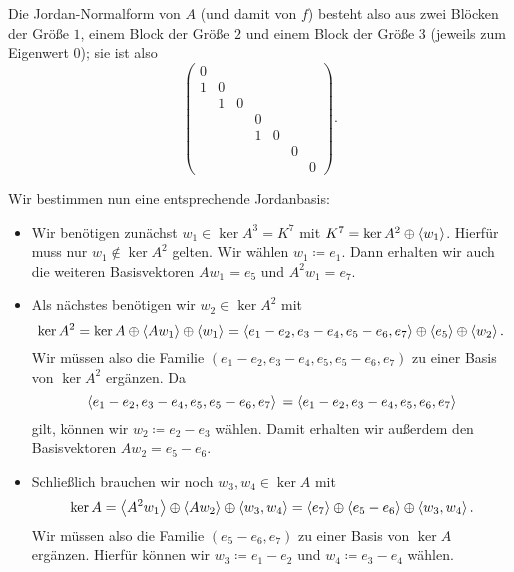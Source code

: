 \begin{example}
  Die Jordan-Normalform von $A$ (und damit von $f$) besteht also aus zwei Blöcken der Größe $1$, einem Block der Größe $2$ und einem Block der Größe $3$ (jeweils zum Eigenwert $0$);
  sie ist also
  \[
    \begin{pmatrix}
      0 &   &   &   &   &   &   \\
      1 & 0 &   &   &   &   &   \\
        & 1 & 0 &   &   &   &   \\
        &   &   & 0 &   &   &   \\
        &   &   & 1 & 0 &   &   \\
        &   &   &   &   & 0 &   \\
        &   &   &   &   &   & 0
    \end{pmatrix}.
  \]

  Wir bestimmen nun eine entsprechende Jordanbasis:
  \begin{itemize}
    \item
      Wir benötigen zunächst $w_1 \in \ker A^3 = K^7$ mit $K^7 = \ker A^2 \oplus \left\langle w_1 \right\rangle$.
      Hierfür muss nur $w_1 \notin \ker A^2$ gelten.
      Wir wählen $w_1 \coloneqq e_1$.
      Dann erhalten wir auch die weiteren Basisvektoren $A w_1 = e_5$ und $A^2 w_1 = e_7$.
    \item
      Als nächstes benötigen wir $w_2 \in \ker A^2$ mit
      \[
          \ker A^2
        =         \ker A
          \oplus  \left\langle A w_1 \right\rangle
          \oplus  \left\langle w_1 \right\rangle
        =         \left\langle e_1 - e_2, e_3 - e_4, e_5 - e_6, e_7 \right\rangle
          \oplus  \left\langle e_5 \right\rangle
          \oplus  \left\langle w_2 \right\rangle.
      \]
      Wir müssen also die Familie $( e_1 - e_2, e_3 - e_4, e_5, e_5 - e_6, e_7 )$ zu einer Basis von $\ker A^2$ ergänzen.
      Da
      \[
          \left\langle  e_1 - e_2, e_3 - e_4, e_5, e_5 - e_6, e_7  \right\rangle \\
        = \left\langle  e_1 - e_2, e_3 - e_4, e_5, e_6, e_7  \right\rangle
      \]
      gilt, können wir $w_2 \coloneqq e_2 - e_3$ wählen.
      Damit erhalten wir außerdem den Basisvektoren $A w_2 = e_5 - e_6$.
    \item
      Schließlich brauchen wir noch $w_3, w_4 \in \ker A$ mit
      \[
          \ker A
        =         \left\langle A^2 w_1 \right\rangle
          \oplus  \left\langle A w_2 \right\rangle
          \oplus  \left\langle w_3, w_4 \right\rangle
        =         \left\langle e_7 \right\rangle
          \oplus  \left\langle e_5 - e_6 \right\rangle
          \oplus  \left\langle w_3, w_4 \right\rangle.
      \]
      Wir müssen also die Familie $(e_5 - e_6, e_7)$ zu einer Basis von $\ker A$ ergänzen.
      Hierfür können wir $w_3 \coloneqq e_1 - e_2$ und $w_4 \coloneqq e_3 - e_4$ wählen.
  \end{itemize}


\end{example}
